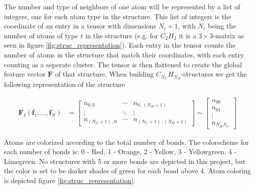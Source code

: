 The number and type of neighbors of one atom will be represented by a list of integers, one for each atom type in the structure. This list of integers is the coordinate of an entry in a tensor with dimensions $N_t + 1$, with $N_t$ being the number of atoms of type $t$ in the structure (e.g. for $C_2H_2$ it is a $3\times3$-matrix as seen in figure \ref{fig:struc_representation}). Each entry in the tensor counts the number of atoms in the structure that match their coordinates, with each entry counting as a seperate cluster. The tensor is then flattened to create the global feature vector $\mathbf{F}$ of that structure. When building $C_{N_C}H_{N_H}$-structures we get the following representation of the structure

\begin{align}
\mathbf{F}_I(\mathbf{f}_1,...,\mathbf{f}_N) &= 
\begin{bmatrix}
n_{0,0} 				& \cdots & n_{0, \, (N_H + 1)} \\
\vdots 					& \ddots & \vdots \\
n_{(N_C + 1) \, , 0} 	& \cdots & n_{(N_C + 1)  \, , (N_H +1)}
\end{bmatrix}
\sim
\begin{bmatrix}
n_{00} \\
n_{01} \\
\vdots \\
n_{N_H N_C}
\end{bmatrix} 
\end{align}

Atoms are colorized according to the total number of bonds. The colorscheme for each number of bonds is: 0 - Red, 1 - Orange, 2 - Yellow, 3 - Yellowgreen, 4 - Limegreen. No structures with 5 or more bonds are depicted in this project, but the color is set to be darker shades of green for each bond above 4. Atom coloring is depicted figure \ref{fig:struc_representation}. 

